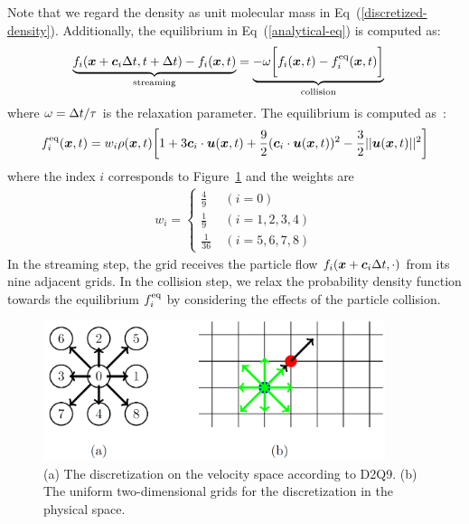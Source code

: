 Note that we regard the density as
unit molecular mass in Eq~(\ref{discretized-density}).
Additionally, the equilibrium in Eq~(\ref{analytical-eq}) is computed as:
\begin{equation}
\begin{aligned}
  \underbrace{f_i(\boldsymbol{x} + \boldsymbol{c}_i\Delta t , t + \Delta t) - f_i(\boldsymbol{x}, t)}_{
    \text{streaming}
  } &= 
  \underbrace{- \omega 
  \biggl[
    f_i(\boldsymbol{x}, t) -
    f^{\rm eq}_i(\boldsymbol{x}, t)
  \biggl]}_{
    \text{collision}
  }
\end{aligned}
\label{discretized-streaming}
\end{equation}
where $\omega = \Delta t / \tau$ is the relaxation parameter.
The equilibrium is computed as~\cite{zhao2002non}:
\begin{equation}
\begin{aligned}
  f^{\rm eq}_i(\boldsymbol{x}, t) &=
  w_i \rho(\boldsymbol{x}, t) \biggl[
    1 + 3 \boldsymbol{c}_i \cdot \boldsymbol{u}(\boldsymbol{x}, t) +
    \frac{9}{2}(\boldsymbol{c}_i \cdot \boldsymbol{u}(\boldsymbol{x}, t))^2
    -\frac{3}{2} || \boldsymbol{u}(\boldsymbol{x}, t) ||^2
  \biggr] \\
\end{aligned}
\label{discretized-eq}
\end{equation}
where the index $i$ corresponds to Figure~\ref{fig:d2q9}
and the weights are 
\begin{eqnarray}
  w_i = \left\{
  \begin{array}{cl}
     \frac{4}{9}&~(i = 0) \\
     \frac{1}{9}&~(i=1,2,3,4) \\
     \frac{1}{36}&~(i=5,6,7,8)
  \end{array}
  \right.
\end{eqnarray}
In the streaming step, the grid receives 
the particle flow $f_i(\boldsymbol{x} + \boldsymbol{c}_i \Delta t, \cdot)$
from its nine adjacent grids.
In the collision step,
we relax the probability density function 
towards the equilibrium $f_i^{\rm eq}$
by considering the effects of the particle collision.

\begin{figure}[h!]
  \begin{center}
   \includegraphics[width=10cm]{logos/Gitter_LBM.png}
   \caption{
      (a) The discretization on the velocity space according to D2Q9.
      (b) The uniform two-dimensional grids for
      the discretization in the physical space.
   }
  \label{fig:d2q9}
  \end{center}
\end{figure}

